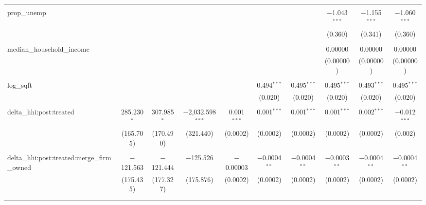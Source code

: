 \begin{table}[H]
{\begin{tabular}{@{\extracolsep{5pt}}lccccccccc}
   & & & & & & & & & \\  

  prop\_unemp &  &  &  &  &  &  & $-$1.043$^{***}$ & $-$1.155$^{***}$ & $-$1.060$^{***}$ \\  

   &  &  &  &  &  &  & (0.360) & (0.341) & (0.360) \\  

   & & & & & & & & & \\  

  median\_household\_income &  &  &  &  &  &  & 0.00000 & 0.00000 & 0.00000 \\  

   &  &  &  &  &  &  & (0.00000) & (0.00000) & (0.00000) \\  

   & & & & & & & & & \\  

  log\_sqft &  &  &  &  & 0.494$^{***}$ & 0.495$^{***}$ & 0.495$^{***}$ & 0.493$^{***}$ & 0.495$^{***}$ \\  

   &  &  &  &  & (0.020) & (0.020) & (0.020) & (0.020) & (0.020) \\  

   & & & & & & & & & \\  

  delta\_hhi:post:treated & 285.230$^{*}$ & 307.985$^{*}$ & $-$2,032.598$^{***}$ & 0.001$^{***}$ & 0.001$^{***}$ & 0.001$^{***}$ & 0.001$^{***}$ & 0.002$^{***}$ & $-$0.012$^{***}$ \\  

   & (165.705) & (170.490) & (321.440) & (0.0002) & (0.0002) & (0.0002) & (0.0002) & (0.0002) & (0.002) \\  

   & & & & & & & & & \\  

  delta\_hhi:post:treated:merge\_firm\_owned & $-$121.563 & $-$121.444 & $-$125.526 & $-$0.00003 & $-$0.0004$^{**}$ & $-$0.0004$^{**}$ & $-$0.0003$^{**}$ & $-$0.0004$^{**}$ & $-$0.0004$^{**}$ \\  

   & (175.435) & (177.327) & (175.876) & (0.0002) & (0.0002) & (0.0002) & (0.0002) & (0.0002) & (0.0002) \\  

   & & & & & & & & & \\  

 \hline \\[-1.8ex]  


\end{tabular}}
\end{table}

